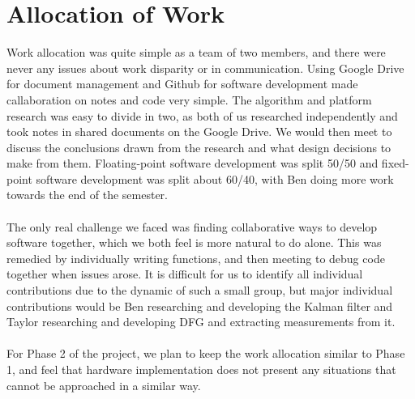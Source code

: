 \documentclass[12pt]{article} %
\begin{document}
\section{Allocation of Work}
Work allocation was quite simple as a team of two members, and there were never any issues about work disparity or in communication. Using Google Drive for document management and Github for software development made callaboration on notes and code very simple. The algorithm and platform research was easy to divide in two, as both of us researched independently and took notes in shared documents on the Google Drive. We would then meet to discuss the conclusions drawn from the research and what design decisions to make from them. Floating-point software development was split 50/50 and fixed-point software development was split about 60/40, with Ben doing more work towards the end of the semester. \\\\
The only real challenge we faced was finding collaborative ways to develop software together, which we both feel is more natural to do alone. This was remedied by individually writing functions, and then meeting to debug code together when issues arose. It is difficult for us to identify all individual contributions due to the dynamic of such a small group, but major individual contributions would be Ben researching and developing the Kalman filter and Taylor researching and developing DFG and extracting measurements from it. \\\\
For Phase 2 of the project, we plan to keep the work allocation similar to Phase 1, and feel that hardware implementation does not present any situations that cannot be approached in a similar way. 
\end{document}
